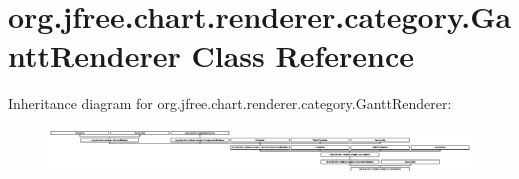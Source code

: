 \hypertarget{classorg_1_1jfree_1_1chart_1_1renderer_1_1category_1_1_gantt_renderer}{}\section{org.\+jfree.\+chart.\+renderer.\+category.\+Gantt\+Renderer Class Reference}
\label{classorg_1_1jfree_1_1chart_1_1renderer_1_1category_1_1_gantt_renderer}
Inheritance diagram for org.\+jfree.\+chart.\+renderer.\+category.\+Gantt\+Renderer\+:\begin{figure}[H]
\begin{center}
\leavevmode
\includegraphics[height=1.237113cm]{classorg_1_1jfree_1_1chart_1_1renderer_1_1category_1_1_gantt_renderer}
\end{center}
\end{figure}
